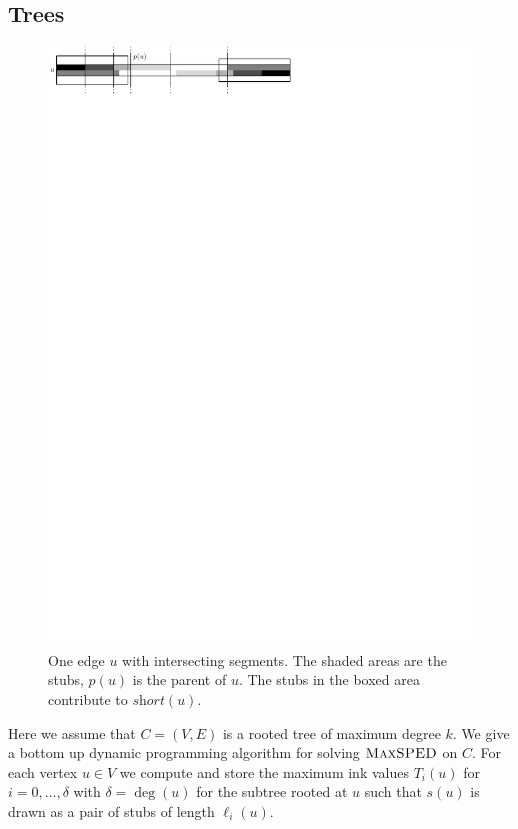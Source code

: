\documentclass[a4paper,english,numberwithinsect]{eurocg18}
\newcommand{\maxsped}{\ensuremath{\textsc{MaxSPED}}\xspace}
\newcommand{\solshort}{\ensuremath{\textit{short}}\xspace}
\begin{document}
\subsection{Trees}
\label{sec:tree}
\begin{figure}[tbp]
	\centering
 	\includegraphics{tree_illustration}
	\caption{One edge $ u $ with intersecting segments. The shaded areas are the stubs, $ p(u) $ is the parent of $ u $. The stubs in the boxed area contribute to $ \solshort(u) $.}
	\label{fig:tree}
\end{figure}
Here we assume that $ C =(V,E) $ is a rooted tree of maximum degree $ k $. 
We give a bottom up dynamic programming algorithm for solving \maxsped on $ C $. 
For each vertex $u \in V$ we compute and store the maximum ink values $T_i(u)$ for $i = 0, \dots, \delta$ with $\delta = \deg(u)$ for the subtree rooted at $u$ such that $s(u)$ is drawn as a pair of stubs of length $\ell_i(u)$.
\end{document}
